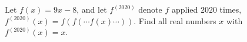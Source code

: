 Let $f(x)=9x-8$, and let $f^{(2020)}$ denote $f$ applied $2020$ times, $f^{(2020)}(x)=f(f(\cdots f(x)\cdots))$. Find all real numbers $x$ with $f^{(2020)}(x)=x$.
